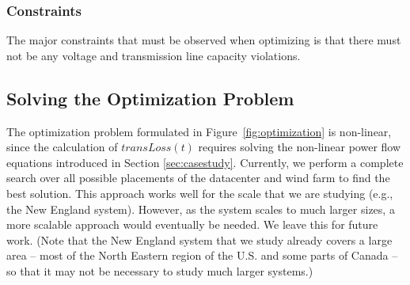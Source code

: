 

\subsubsection{Constraints}
The major constraints that must be observed when optimizing is that there must not be any voltage and transmission line capacity violations.



\subsection{Solving the Optimization Problem}

The optimization problem formulated in Figure~\ref{fig:optimization} is non-linear, since the calculation of $transLoss(t)$ requires solving the non-linear power flow equations introduced in Section \ref{sec:casestudy}.  Currently, we perform a complete search over all possible placements of the datacenter and wind farm to find the best solution.  This approach works well for the scale that we are studying (e.g., the New England system).  However, as the system scales to much larger sizes, a more scalable approach would eventually be needed.  We leave this for future work.  (Note that the New England system that we study already covers a large area -- most of the North Eastern region of the U.S. and some parts of Canada -- so that it may not be necessary to study much larger systems.)

